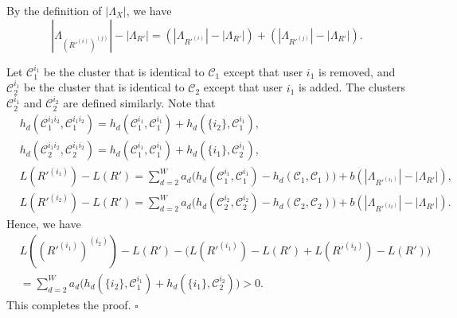 \documentclass{article}
\begin{document}
    By the definition of $|\Lambda_{X}|$, we have
	\begin{equation}\label{p6_2}
		|\Lambda_{(R'^{(i)})^{(j)}}| - |\Lambda_{R'}| = \left(|\Lambda_{R'^{(i)}}| - |\Lambda_{R'}|\right) + \left(|\Lambda_{R'^{(j)}}| - |\Lambda_{R'}|\right).
	\end{equation}

Let $\mathcal{C}_1^{i_1}$ be the cluster that is identical to $\mathcal{C}_1$ except that user $i_1$ is removed, and $\mathcal{C}_2^{i_1}$ be the cluster that is identical to $\mathcal{C}_2$ except that user $i_1$ is added. The clusters $\mathcal{C}_2^{i_1}$ and $\mathcal{C}_2^{i_2}$ are defined similarly. 
 Note that
    $$
    \begin{aligned}
        &h_d( \mathcal{C}_1^{i_1i_2},  \mathcal{C}_1^{i_1i_2}) = h_d( \mathcal{C}_1^{i_1},  \mathcal{C}_1^{i_1}) + h_d( \{ i_2 \}, \mathcal{C}_1^{i_1} ) , \\
        &h_d( \mathcal{C}_2^{i_1i_2},  \mathcal{C}_2^{i_1i_2}) = h_d( \mathcal{C}_1^{i_1},  \mathcal{C}_1^{i_1}) + h_d( \{ i_1 \}, \mathcal{C}_2^{i_1} ) , \\
        &L (R'^{(i_1)}) - L(R') = \sum_{d=2}^W a_d \Big( h_d( \mathcal{C}_1^{i_1},  \mathcal{C}_1^{i_1}) - h_d( \mathcal{C}_1, \mathcal{C}_1 ) \Big) + b ( |\Lambda_{R'^{(i_1)}}| - |\Lambda_{R'}| ), \\
        & L (R'^{(i_2)}) - L(R') = \sum_{d=2}^W a_d \Big( h_d( \mathcal{C}_2^{i_2},  \mathcal{C}_2^{i_2}) - h_d( \mathcal{C}_2, \mathcal{C}_2 ) \Big) + b ( |\Lambda_{R'^{(i_2)}}| - |\Lambda_{R'}| ).
    \end{aligned}
    $$
    Hence, we have
    $$
    \begin{aligned}
            &L((R'^{(i_1)})^{(i_2)}) - L(R') -\Big( L(R'^{(i_1)}) - L(R') + L(R'^{(i_2)}) - L(R') \Big) \\
            &= \sum_{d=2}^W a_d \Big( h_d( \{ i_2 \}, \mathcal{C}_1^{i_1} ) + h_d( \{ i_1 \}, \mathcal{C}_2^{i_2} ) \Big) > 0.
    \end{aligned}
    $$
 This completes the proof.
  \hfill $\square$\par
\end{document}
